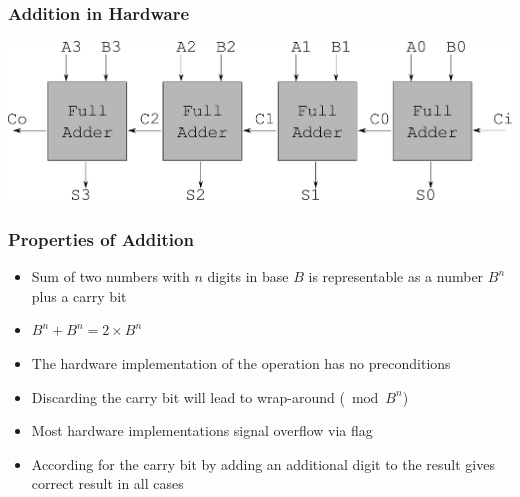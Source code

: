 \documentclass[aspectratio=169]{beamer}
\newif\iftransitions
\begin{document}
\begin{frame}
  \frametitle{Addition in Hardware}
  
  \includegraphics[width=.95\textwidth]{arithgfx/adder_ripple_carry.png}
\end{frame}

\begin{frame}
  \frametitle{Properties of Addition}
  \begin{itemize}
  \item Sum of two numbers with $n$ digits in base $B$ is representable as a number $B^n$ plus a carry bit
  \item $B^n + B^n = 2 \times B^n$ \iftransitions \pause \fi 
  \item The hardware implementation of the operation has no preconditions \iftransitions \pause \fi 
  \item Discarding the carry bit will lead to wrap-around ($\bmod B^n$)   \iftransitions \pause \fi 
  \item Most hardware implementations signal overflow via flag            \iftransitions \pause \fi 
  \item According for the carry bit by adding an additional digit to the result gives correct result in all cases
  \end{itemize}
\end{frame}
\end{document}
